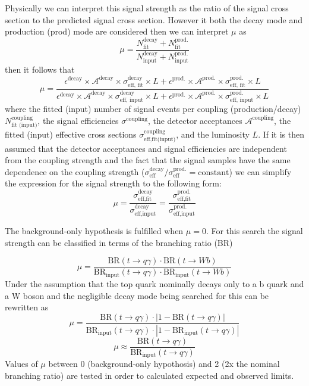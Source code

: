 Physically we can interpret this signal strength as the ratio of the signal cross section to the predicted signal cross section.  However it both the decay mode and production (prod) mode are considered then we can interpret $\mu$ as 
\[\mu = \frac{N_\text{fit}^\text{decay} + N_\text{fit}^\text{prod.}}{N_\text{input}^\text{decay} + N_\text{input}^\text{prod.}}
\]then it follows that 
\[\mu = \frac{\epsilon^\text{decay}\times \mathcal{A}^\text{decay} \times \sigma^\text{decay}_\text{eff, fit}\times L+\epsilon^\text{prod.}\times \mathcal{A}^\text{prod.} \times \sigma^\text{prod.}_\text{eff, fit} \times L}{\epsilon^\text{decay}\times \mathcal{A}^\text{decay} \times \sigma^\text{decay}_\text{eff, input} \times L+\epsilon^\text{prod.}\times \mathcal{A}^\text{prod.} \times \sigma^\text{prod.}_\text{eff, input}\times L}
\]
where the fitted (input) number of signal events per coupling (production/decay) $N_\text{fit (input)}^\text{coupling}$, the signal efficiencies $\sigma^\text{coupling}$, the detector acceptances $\mathcal{A}^\text{coupling}$, the fitted (input) effective cross sections $\sigma_\text{eff,fit(input)}^\text{coupling}$, and the luminosity $L$.  If it is then assumed that the detector acceptances and signal efficiencies are independent from the coupling strength and the fact that the signal samples have the same dependence on the coupling strength ($\sigma_\text{eff}^\text{decay}/ \sigma_\text{eff}^\text{prod.} = \text{constant}$) we can simplify the expression for the signal strength to the following form:
\[ \mu = \frac{\sigma_\text{eff,fit}^\text{decay}}{\sigma_\text{eff,input}^\text{decay}}=\frac{\sigma_\text{eff,fit}^\text{prod.}}{\sigma_\text{eff,input}^\text{prod.}}
\]

The background-only hypothesis is fulfilled when $\mu=0$.
For this search the signal strength can be classified in terms of the branching ratio (BR)

\[ \mu = \frac{\text{BR}(t\rightarrow q\gamma) \cdot \text{BR}(t\rightarrow Wb)}{\text{BR}_\text{input}(t\rightarrow q\gamma) \cdot \text{BR}_\text{input}(t\rightarrow Wb)}
\]
Under the assumption that the top quark nominally decays only to a b quark and a W boson and the negligible decay mode being searched for this can be rewritten as 
\[ \mu = \frac{\text{BR}(t\rightarrow q\gamma) \cdot|1-\text{BR}(t\rightarrow q\gamma)|}{\text{BR}_\text{input}(t\rightarrow q\gamma) \cdot|1-\text{BR}_\text{input}(t\rightarrow q\gamma)|}
\]
\[ \mu \approx \frac{\text{BR}(t\rightarrow q\gamma)}{\text{BR}_\text{input}(t\rightarrow q\gamma)}
\]
Values of $\mu$ between 0 (background-only hypothosis) and 2 (2x the nominal branching ratio) are tested in order to calculated expected and observed limits. %

